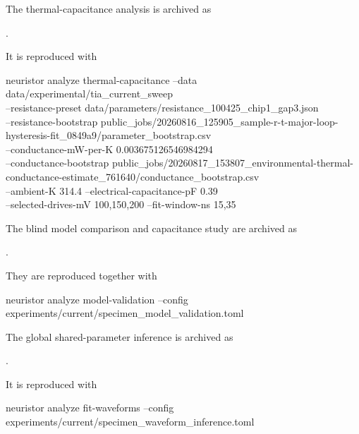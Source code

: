\documentclass[11pt]{article}
\begin{document}
The thermal-capacitance analysis is archived as

\begin{center}
\footnotesize
{}.
\end{center}

It is reproduced with

\begin{center}
\ttfamily\scriptsize
neuristor analyze thermal-capacitance --data data/experimental/tia\_current\_sweep \\
--resistance-preset data/parameters/resistance\_100425\_chip1\_gap3.json \\
--resistance-bootstrap public\_jobs/20260816\_125905\_sample-r-t-major-loop-hysteresis-fit\_0849a9/parameter\_bootstrap.csv \\
--conductance-mW-per-K 0.003675126546984294 \\
--conductance-bootstrap public\_jobs/20260817\_153807\_environmental-thermal-conductance-estimate\_761640/conductance\_bootstrap.csv \\
--ambient-K 314.4 --electrical-capacitance-pF 0.39 \\
--selected-drives-mV 100,150,200 --fit-window-ns 15,35
\end{center}

The blind model comparison and capacitance study are archived as

\begin{center}
\footnotesize
{}.
\end{center}

They are reproduced together with

\begin{center}
\ttfamily\small
neuristor analyze model-validation --config experiments/current/specimen\_model\_validation.toml
\end{center}

The global shared-parameter inference is archived as

\begin{center}
\footnotesize
{}.
\end{center}

It is reproduced with

\begin{center}
\ttfamily\small
neuristor analyze fit-waveforms --config experiments/current/specimen\_waveform\_inference.toml
\end{center}
\end{document}
